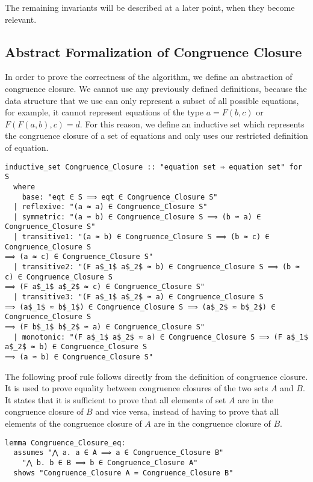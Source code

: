 The remaining invariants will be described at a later point, when they become relevant.

\subsection{Abstract Formalization of Congruence Closure}
\label{subsection:abstraction}

In order to prove the correctness of the algorithm, we define an abstraction of congruence closure. We cannot use any previously defined definitions, because the data structure that we use can only represent a subset of all possible equations, for example, it cannot represent equations of the type $a = F(b, c)$ or $F (F (a, b), c) = d$. For this reason, we define an inductive set which represents the congruence closure of a set of equations and only uses our restricted definition of equation.

\begin{lstlisting}
inductive_set Congruence_Closure :: "equation set ⇒ equation set" for S
  where
    base: "eqt ∈ S ⟹ eqt ∈ Congruence_Closure S"
  | reflexive: "(a ≈ a) ∈ Congruence_Closure S"
  | symmetric: "(a ≈ b) ∈ Congruence_Closure S ⟹ (b ≈ a) ∈ Congruence_Closure S"
  | transitive1: "(a ≈ b) ∈ Congruence_Closure S ⟹ (b ≈ c) ∈ Congruence_Closure S
⟹ (a ≈ c) ∈ Congruence_Closure S"
  | transitive2: "(F a$_1$ a$_2$ ≈ b) ∈ Congruence_Closure S ⟹ (b ≈ c) ∈ Congruence_Closure S
⟹ (F a$_1$ a$_2$ ≈ c) ∈ Congruence_Closure S"
  | transitive3: "(F a$_1$ a$_2$ ≈ a) ∈ Congruence_Closure S
⟹ (a$_1$ ≈ b$_1$) ∈ Congruence_Closure S ⟹ (a$_2$ ≈ b$_2$) ∈ Congruence_Closure S
⟹ (F b$_1$ b$_2$ ≈ a) ∈ Congruence_Closure S"
  | monotonic: "(F a$_1$ a$_2$ ≈ a) ∈ Congruence_Closure S ⟹ (F a$_1$ a$_2$ ≈ b) ∈ Congruence_Closure S
⟹ (a ≈ b) ∈ Congruence_Closure S"
\end{lstlisting}

The following proof rule follows directly from the definition of congruence closure. It is used to prove equality between congruence closures of the two sets $A$ and $B$. It states that it is sufficient to prove that all elements of set $A$ are in the congruence closure of $B$ and vice versa, instead of having to prove that all elements of the congruence closure of $A$ are in the congruence closure of $B$.

\begin{lstlisting}
lemma Congruence_Closure_eq:
  assumes "⋀ a. a ∈ A ⟹ a ∈ Congruence_Closure B"
    "⋀ b. b ∈ B ⟹ b ∈ Congruence_Closure A"
  shows "Congruence_Closure A = Congruence_Closure B"
\end{lstlisting}

